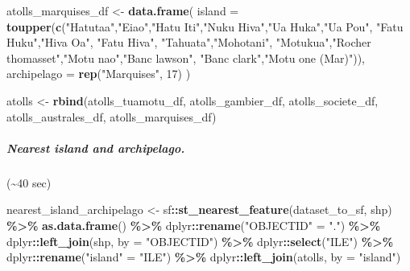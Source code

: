 \documentclass[
]{article}
\newenvironment{Shaded}{\begin{snugshade}}{\end{snugshade}}
\newcommand{\AttributeTok}[1]{\textcolor[rgb]{0.13,0.29,0.53}{#1}}
\newcommand{\DecValTok}[1]{\textcolor[rgb]{0.00,0.00,0.81}{#1}}
\newcommand{\FunctionTok}[1]{\textcolor[rgb]{0.13,0.29,0.53}{\textbf{#1}}}
\newcommand{\NormalTok}[1]{#1}
\newcommand{\OtherTok}[1]{\textcolor[rgb]{0.56,0.35,0.01}{#1}}
\newcommand{\SpecialCharTok}[1]{\textcolor[rgb]{0.81,0.36,0.00}{\textbf{#1}}}
\newcommand{\StringTok}[1]{\textcolor[rgb]{0.31,0.60,0.02}{#1}}
\begin{document}
\begin{Shaded}
\begin{Highlighting}[]
\NormalTok{atolls\_marquises\_df }\OtherTok{\textless{}{-}} \FunctionTok{data.frame}\NormalTok{(}
  \AttributeTok{island =} \FunctionTok{toupper}\NormalTok{(}\FunctionTok{c}\NormalTok{(}\StringTok{"Hatutaa"}\NormalTok{,}\StringTok{"Eiao"}\NormalTok{,}\StringTok{"Hatu Iti"}\NormalTok{,}\StringTok{"Nuku Hiva"}\NormalTok{,}\StringTok{"Ua Huka"}\NormalTok{,}\StringTok{"Ua Pou"}\NormalTok{, }
                  \StringTok{"Fatu Huku"}\NormalTok{,}\StringTok{"Hiva Oa"}\NormalTok{, }\StringTok{"Fatu Hiva"}\NormalTok{, }\StringTok{"Tahuata"}\NormalTok{,}\StringTok{"Mohotani"}\NormalTok{,}
                  \StringTok{"Motukua"}\NormalTok{,}\StringTok{"Rocher thomasset"}\NormalTok{,}\StringTok{"Motu nao"}\NormalTok{,}\StringTok{"Banc lawson"}\NormalTok{,}
                  \StringTok{"Banc clark"}\NormalTok{,}\StringTok{"Motu one (Mar)"}\NormalTok{)),}
  \AttributeTok{archipelago =} \FunctionTok{rep}\NormalTok{(}\StringTok{"Marquises"}\NormalTok{, }\DecValTok{17}\NormalTok{)}
\NormalTok{)}

\NormalTok{atolls }\OtherTok{\textless{}{-}} \FunctionTok{rbind}\NormalTok{(atolls\_tuamotu\_df, atolls\_gambier\_df, atolls\_societe\_df, }
\NormalTok{                atolls\_australes\_df, atolls\_marquises\_df)}
\end{Highlighting}
\end{Shaded}

\hypertarget{nearest-island-and-archipelago.}{%
\subparagraph{Nearest island and
archipelago.}\label{nearest-island-and-archipelago.}}

(\textasciitilde40 sec)

\begin{Shaded}
\begin{Highlighting}[]
\NormalTok{nearest\_island\_archipelago }\OtherTok{\textless{}{-}}\NormalTok{ sf}\SpecialCharTok{::}\FunctionTok{st\_nearest\_feature}\NormalTok{(dataset\_to\_sf, shp) }\SpecialCharTok{\%\textgreater{}\%}
  \FunctionTok{as.data.frame}\NormalTok{() }\SpecialCharTok{\%\textgreater{}\%}
\NormalTok{  dplyr}\SpecialCharTok{::}\FunctionTok{rename}\NormalTok{(}\StringTok{"OBJECTID"} \OtherTok{=} \StringTok{"."}\NormalTok{) }\SpecialCharTok{\%\textgreater{}\%}
\NormalTok{  dplyr}\SpecialCharTok{::}\FunctionTok{left\_join}\NormalTok{(shp, }\AttributeTok{by =} \StringTok{"OBJECTID"}\NormalTok{) }\SpecialCharTok{\%\textgreater{}\%}
\NormalTok{  dplyr}\SpecialCharTok{::}\FunctionTok{select}\NormalTok{(}\StringTok{"ILE"}\NormalTok{) }\SpecialCharTok{\%\textgreater{}\%}
\NormalTok{  dplyr}\SpecialCharTok{::}\FunctionTok{rename}\NormalTok{(}\StringTok{"island"} \OtherTok{=} \StringTok{"ILE"}\NormalTok{) }\SpecialCharTok{\%\textgreater{}\%}
\NormalTok{  dplyr}\SpecialCharTok{::}\FunctionTok{left\_join}\NormalTok{(atolls, }\AttributeTok{by =} \StringTok{"island"}\NormalTok{)}
\end{Highlighting}
\end{Shaded}
\end{document}
